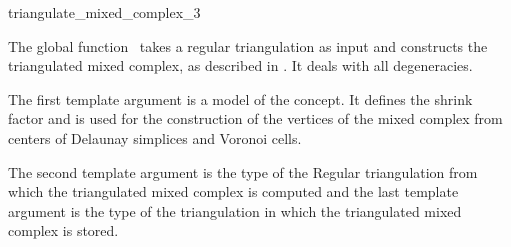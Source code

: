 

\begin{ccRefFunction}{triangulate_mixed_complex_3}

\ccDefinition The global function \ccRefName\ takes a regular
triangulation as input and constructs the triangulated mixed
complex, as described in \cite{kv-mssct-05}. It deals with all
degeneracies.



\ccParameters 
%
The first template argument  is a model of
the  concept. It defines the shrink factor
and is used for the construction of the vertices of the mixed complex
from centers of Delaunay simplices and Voronoi cells.

The second template argument is the type of the Regular triangulation
from which the triangulated mixed complex is computed and the last
template argument is the type of the triangulation in which the
triangulated mixed complex is stored. 

\ccThreeToTwo




\end{ccRefFunction}


